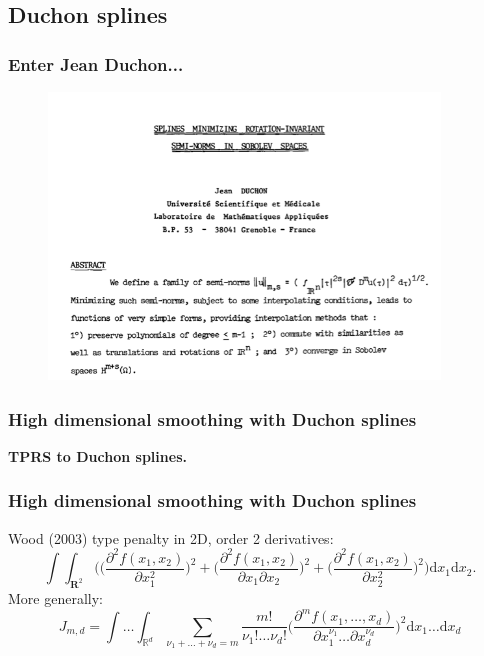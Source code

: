 \documentclass[ignorenonframetext]{beamer} %
\newcommand{\bc}{\begin{center}}
\newcommand{\ec}{\end{center}}
\newcommand{\bi}{\begin{itemize}}
\newcommand{\ei}{\end{itemize}}
\begin{document}





\subsection{Duchon splines}

\begin{frame}
	\frametitle{Enter Jean Duchon...} 
	\begin{figure}
		\includegraphics[height=3in]{figs/Duchon-paper.png}
	\end{figure}
\end{frame}

\begin{frame}
	\frametitle{High dimensional smoothing with Duchon splines}
	\bc \textbf{TPRS to Duchon splines.}\ec
\end{frame}


\begin{frame}
	\frametitle{High dimensional smoothing with Duchon splines}
	Wood (2003) type penalty in 2D, order 2 derivatives:
	            \begin{equation*}
	            \int\int_{\mathbf{R}^2} \Big( \Big(\frac{\partial^2 f(x_1,x_2)}{\partial x_1^2}\Big)^2 + \Big(\frac{\partial^2 f(x_1,x_2)}{\partial x_1 \partial x_2}\Big)^2 + \Big(\frac{\partial^2 f(x_1,x_2)}{\partial x_2^2}\Big)^2\Big) \text{d}x_1\text{d}x_2.
            \end{equation*}
	More generally:
	\begin{equation*}
		J_{m,d} = \int \ldots \int_{\mathbb{R}^d} \sum_{\nu_1 + \dots + \nu_d=m} \frac{m!}{\nu_1! \dots \nu_d!}\Big( \frac{\partial^m f(x_1,\dots,x_d)}{\partial x_1^{\nu_1} \ldots  \partial x_d^{\nu_d}} \Big)^2 \text{d} x_1 \ldots  \text{d} x_d
	\end{equation*}
\end{frame}
\end{document}

